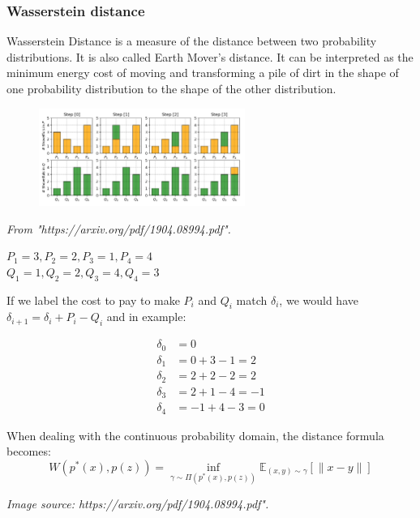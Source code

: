 \documentclass{tum-presentation}
\begin{document}
\begin{frame}
	\frametitle{Wasserstein distance}
	\large Wasserstein Distance is a measure of the distance between two probability distributions. It is also called Earth Mover’s distance. It can be interpreted as the minimum energy cost of moving and transforming a pile of dirt in the shape of one probability distribution to the shape of the other distribution. 
	\vskip 0.2in
	\begin{figure}
		\centering
		\includegraphics[width=0.6\textwidth,keepaspectratio=true]{tum-resources/images/wgan_2.png}
		\label{fig:wgan_2}
	\end{figure}
\begin{flushright}
	\textit{	From "https://arxiv.org/pdf/1904.08994.pdf". }
\end{flushright}
\end{frame}

\begin{frame}
\begin{center}
	$ P_1 = 3, P_2 = 2, P_3 = 1, P_4 = 4 $ \\
	$ Q_1 = 1, Q_2 = 2, Q_3 = 4, Q_4 = 3$
\end{center}
If we label the cost to pay to make $P_i$ and $Q_i$ match $\delta_i$, we would have $\delta_{i+1} = \delta_i + P_i - Q_i$
and in example:
\begin{center}
	\begin{equation}	
	\begin{aligned}
	\delta_0 &= 0\\
	\delta_1 &= 0 + 3 - 1 = 2\\
	\delta_2 &= 2 + 2 - 2 = 2\\
	\delta_3 &= 2 + 1 - 4 = -1\\
	\delta_4 &= -1 + 4 - 3 = 0
	\end{aligned} %
	\end{equation}
\end{center}
\large When dealing with the continuous probability domain, the distance formula becomes:
\begin{equation}
W(p^{*}(x), p(z)) = \inf_{\gamma \sim \Pi(p^{*}(x), p(z))} \mathbb{E}_{(x, y) \sim \gamma}[\| x-y \|]
\end{equation}
	\begin{flushright}
		\textit{Image source: https://arxiv.org/pdf/1904.08994.pdf".}
	\end{flushright}
\end{frame}
\end{document}

